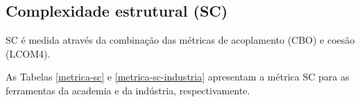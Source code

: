 
\subsection{Complexidade estrutural (SC)}

SC é medida através da combinação das métricas de acoplamento (CBO) e coesão
(LCOM4).

As Tabelas \ref{metrica-sc} e \ref{metrica-sc-industria} apresentam a
métrica SC para as ferramentas da academia e da indústria, respectivamente.




